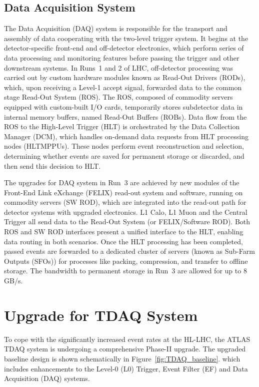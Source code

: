 \subsection{Data Acquisition System}
The Data Acquisition (DAQ) system is responsible for the transport and assembly of data cooperating with the two-level trigger system. It begins at the detector-specific front-end and off-detector electronics, which perform series of data processing and monitoring features before passing the trigger and other downstream systems. In Runs~1 and 2 of LHC, off-detector processing was carried out by custom hardware modules known as Read-Out Drivers (RODs), which, upon receiving a Level-1 accept signal, forwarded data to the common stage Read-Out System (ROS). The ROS, composed of commodity servers equipped with custom-built I/O cards, temporarily stores subdetector data in internal memory buffers, named Read-Out Buffers (ROBs). Data flow from the ROS to the High-Level Trigger (HLT) is orchestrated by the Data Collection Manager (DCM), which handles on-demand data requests from HLT processing nodes (HLTMPPUs). These nodes perform event reconstruction and selection, determining whether events are saved for permanent storage or discarded, and then send this decision to HLT. 

The upgrades for DAQ system in Run~3 are achieved by new modules of the Front-End Link eXchange (FELIX) read-out system and software, running on commodity servers (SW ROD), which are integrated into the read-out path for detector systems with upgraded electronics. L1 Calo, L1 Muon and the Central Trigger all send data to the Read-Out System (or FELIX/Software ROD). Both ROS and SW ROD interfaces present a unified interface to the HLT, enabling data routing in both scenarios. Once the HLT processing has been completed, passed events are forwarded to a dedicated cluster of servers (known as Sub-Farm Outputs (SFOs)) for processes like packing, compression, and transfer to offline storage. The bandwidth to permanent storage in Run~3 are allowed for up to 8 GB/s.

\section{Upgrade for TDAQ System} \label{sec:TDAQUpgrade}
To cope with the significantly increased event rates at the HL-LHC, the ATLAS TDAQ system is undergoing a comprehensive Phase-II upgrade. The upgraded baseline design is shown schematically in Figure~\ref{fig:TDAQ_baseline}. which includes enhancements to the Level-0 (L0) Trigger, Event Filter (EF) and Data Acquisition (DAQ) systems.


